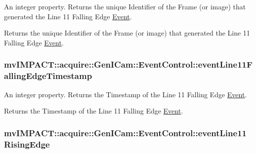An integer property. Returns the unique Identifier of the Frame (or image) that generated the Line 11 Falling Edge \hyperlink{classmv_i_m_p_a_c_t_1_1acquire_1_1_event}{Event}. 

Returns the unique Identifier of the Frame (or image) that generated the Line 11 Falling Edge \hyperlink{classmv_i_m_p_a_c_t_1_1acquire_1_1_event}{Event}. \hypertarget{classmv_i_m_p_a_c_t_1_1acquire_1_1_gen_i_cam_1_1_event_control_a6bdcb1ec1cceb945772d0682418b7e01}{
\subsubsection[{event\+Line11\+Falling\+Edge\+Timestamp}]{ mv\+I\+M\+P\+A\+C\+T\+::acquire\+::\+Gen\+I\+Cam\+::\+Event\+Control\+::event\+Line11\+Falling\+Edge\+Timestamp}}\label{classmv_i_m_p_a_c_t_1_1acquire_1_1_gen_i_cam_1_1_event_control_a6bdcb1ec1cceb945772d0682418b7e01}


An integer property. Returns the Timestamp of the Line 11 Falling Edge \hyperlink{classmv_i_m_p_a_c_t_1_1acquire_1_1_event}{Event}. 

Returns the Timestamp of the Line 11 Falling Edge \hyperlink{classmv_i_m_p_a_c_t_1_1acquire_1_1_event}{Event}. \hypertarget{classmv_i_m_p_a_c_t_1_1acquire_1_1_gen_i_cam_1_1_event_control_af04996da2be11c2a0addbf31166782e7}{
\subsubsection[{event\+Line11\+Rising\+Edge}]{ mv\+I\+M\+P\+A\+C\+T\+::acquire\+::\+Gen\+I\+Cam\+::\+Event\+Control\+::event\+Line11\+Rising\+Edge}}\label{classmv_i_m_p_a_c_t_1_1acquire_1_1_gen_i_cam_1_1_event_control_af04996da2be11c2a0addbf31166782e7}



